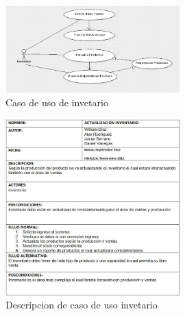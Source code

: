 \begin{figure}[htbp]
	\centering
		\includegraphics[width=0.60\textwidth]{images/casoinventariografico.jpg}
	\caption{Caso de uso de invetario}
	\label{fig:Caso de uso de invetario}
\end{figure}%
\begin{figure}[htbp]
	\centering
		\includegraphics[width=0.60\textwidth]{images/casoinventariotabla.jpg}
	\caption{Descripcion de caso de uso invetario}
	\label{fig:Descripcion de caso de uso invetario}
\end{figure}%
